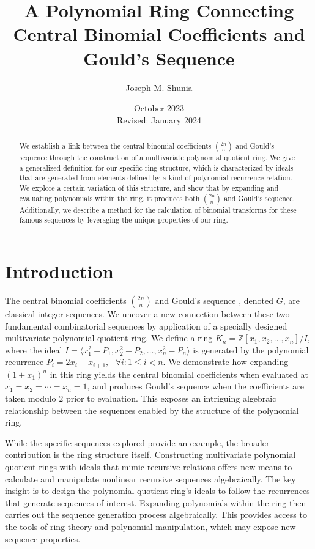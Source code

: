 \documentclass{article}
\theoremstyle{plain}
\theoremstyle{definition}
\newcommand{\Z}{\mathbb{Z}}
\newcommand{\K}{K}
\begin{document}
\title{A Polynomial Ring Connecting Central Binomial Coefficients and Gould's Sequence}
\author{Joseph M. Shunia}
\date{October 2023 \\ \small Revised: January 2024 \normalsize}
\maketitle

\begin{abstract}
We establish a link between the central binomial coefficients $\binom{2n}{n}$ and Gould's sequence through the construction of a multivariate polynomial quotient ring. We give a generalized definition for our specific ring structure, which is characterized by ideals that are generated from elements defined by a kind of polynomial recurrence relation. We explore a certain variation of this structure, and show that by expanding and evaluating  polynomials within the ring, it produces both $\binom{2n}{n}$ and Gould's sequence. Additionally, we describe a method for the calculation of binomial transforms for these famous sequences by leveraging the unique properties of our ring.
\end{abstract}

\section{Introduction}
The central binomial coefficients $\binom{2n}{n}$ \cite{A000984} and Gould's sequence \cite{A001316}, denoted $G$, are classical integer sequences. We uncover a new connection between these two fundamental combinatorial sequences by application of a specially designed multivariate polynomial quotient ring. We define a ring $\K_n = \Z[x_1, x_2, \ldots, x_n]/I$, where the ideal $I = \langle x_1^2 - P_1, x_2^2 - P_2, \ldots, x_n^2 - P_n \rangle$ is generated by the polynomial recurrence $P_i = 2x_i + x_{i+1}, \text{ } \forall i : 1 \leq i < n$. We demonstrate how expanding $(1 + x_1)^n$ in this ring yields the central binomial coefficients when evaluated at $x_1=x_2=\cdots=x_n=1$, and produces Gould's sequence when the coefficients are taken modulo $2$ prior to evaluation. This exposes an intriguing algebraic relationship between the sequences enabled by the structure of the polynomial ring.

While the specific sequences explored provide an example, the broader contribution is the ring structure itself. Constructing multivariate polynomial quotient rings with ideals that mimic recursive relations offers new means to calculate and manipulate nonlinear recursive sequences algebraically. The key insight is to design the polynomial quotient ring's ideals to follow the recurrences that generate sequences of interest. Expanding polynomials within the ring then carries out the sequence generation process algebraically. This provides access to the tools of ring theory and polynomial manipulation, which may expose new sequence properties.
\end{document}
